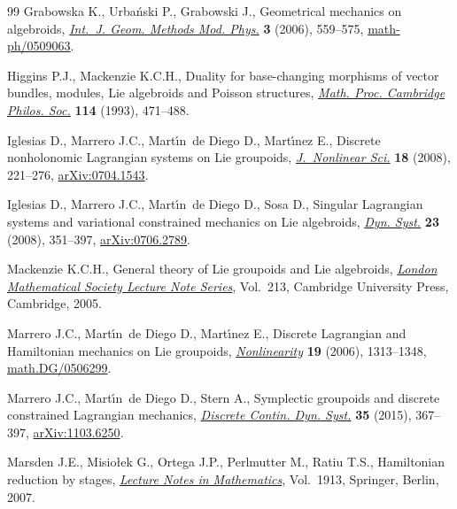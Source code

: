 \begin{thebibliography}{99}
Grabowska K., Urba\'nski P., Grabowski J., Geometrical mechanics on algebroids,
 \href{https://doi.org/10.1142/S0219887806001259}{\textit{Int.~J. Geom. Methods Mod. Phys.}} \textbf{3} (2006), 559--575,
 \href{http://arxiv.org/abs/math-ph/0509063}{math-ph/0509063}.

Higgins P.J., Mackenzie K.C.H., Duality for base-changing morphisms of vector
 bundles, modules, {L}ie algebroids and {P}oisson structures, \href{https://doi.org/10.1017/S0305004100071760}{\textit{Math.
 Proc. Cambridge Philos. Soc.}} \textbf{114} (1993), 471--488.

Iglesias D., Marrero J.C., Mart\'{\i}n~de Diego D., Mart\'{\i}nez E., Discrete
 nonholonomic {L}agrangian systems on {L}ie groupoids, \href{https://doi.org/10.1007/s00332-007-9012-8}{\textit{J.~Nonlinear
 Sci.}} \textbf{18} (2008), 221--276, \href{http://arxiv.org/abs/0704.1543}{arXiv:0704.1543}.

Iglesias D., Marrero J.C., Mart\'{\i}n~de Diego D., Sosa D., Singular
 {L}agrangian systems and variational constrained mechanics on {L}ie
 algebroids, \href{https://doi.org/10.1080/14689360802294220}{\textit{Dyn. Syst.}} \textbf{23} (2008), 351--397,
 \href{http://arxiv.org/abs/0706.2789}{arXiv:0706.2789}.

Mackenzie K.C.H., General theory of {L}ie groupoids and {L}ie algebroids,
 \href{https://doi.org/10.1017/CBO9781107325883}{\textit{London Mathematical Society Lecture Note Series}}, Vol.~213, Cambridge
 University Press, Cambridge, 2005.

Marrero J.C., Mart\'{\i}n~de Diego D., Mart\'{\i}nez E., Discrete {L}agrangian
 and {H}amiltonian mechanics on {L}ie groupoids, \href{https://doi.org/10.1088/0951-7715/19/6/006}{\textit{Nonlinearity}}
 \textbf{19} (2006), 1313--1348, \href{http://arxiv.org/abs/math.DG/0506299}{math.DG/0506299}.

Marrero J.C., Mart\'{\i}n~de Diego D., Stern A., Symplectic groupoids and
 discrete constrained {L}agrangian mechanics, \href{https://doi.org/10.3934/dcds.2015.35.367}{\textit{Discrete Contin. Dyn.
 Syst.}} \textbf{35} (2015), 367--397, \href{http://arxiv.org/abs/1103.6250}{arXiv:1103.6250}.

Marsden J.E., Misio{\l}ek G., Ortega J.P., Perlmutter M., Ratiu T.S.,
 Hamiltonian reduction by stages, \href{https://doi.org/10.1007/978-3-540-72470-4}{\textit{Lecture Notes in Mathematics}}, Vol.~1913, Springer, Berlin, 2007.


\end{thebibliography}
